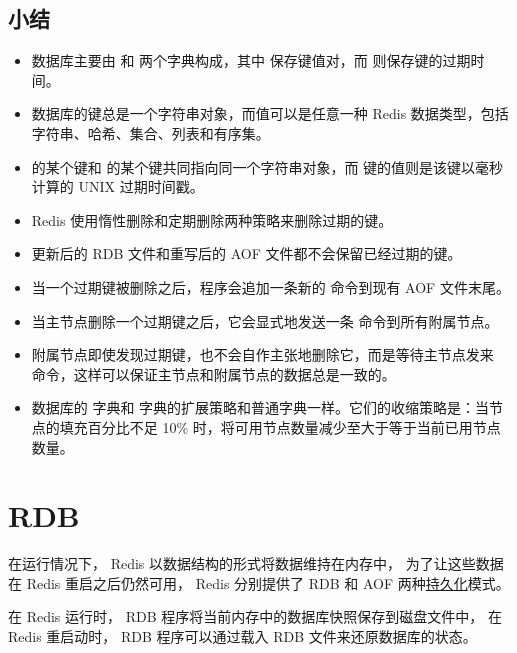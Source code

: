 \documentclass[a4paper,11pt,english]{sphinxmanual}
\begin{document}
\subsection{小结}
\label{internal/db:id24}\begin{itemize}
\item {} 
数据库主要由  和  两个字典构成，其中  保存键值对，而  则保存键的过期时间。

\item {} 
数据库的键总是一个字符串对象，而值可以是任意一种 Redis 数据类型，包括字符串、哈希、集合、列表和有序集。

\item {} 
 的某个键和  的某个键共同指向同一个字符串对象，而  键的值则是该键以毫秒计算的 UNIX 过期时间戳。

\item {} 
Redis 使用惰性删除和定期删除两种策略来删除过期的键。

\item {} 
更新后的 RDB 文件和重写后的 AOF 文件都不会保留已经过期的键。

\item {} 
当一个过期键被删除之后，程序会追加一条新的  命令到现有 AOF 文件末尾。

\item {} 
当主节点删除一个过期键之后，它会显式地发送一条  命令到所有附属节点。

\item {} 
附属节点即使发现过期键，也不会自作主张地删除它，而是等待主节点发来  命令，这样可以保证主节点和附属节点的数据总是一致的。

\item {} 
数据库的  字典和  字典的扩展策略和普通字典一样。它们的收缩策略是：当节点的填充百分比不足 10\% 时，将可用节点数量减少至大于等于当前已用节点数量。

\end{itemize}


\section{RDB}
\label{internal/rdb::doc}\label{internal/rdb:rdb}
在运行情况下，
Redis 以数据结构的形式将数据维持在内存中，
为了让这些数据在 Redis 重启之后仍然可用，
Redis 分别提供了 RDB 和 AOF 两种\href{http://en.wikipedia.org/wiki/Persistence\_(computer\_science)}{持久化}模式。

在 Redis 运行时，
RDB 程序将当前内存中的数据库快照保存到磁盘文件中，
在 Redis 重启动时，
RDB 程序可以通过载入 RDB 文件来还原数据库的状态。
\end{document}
